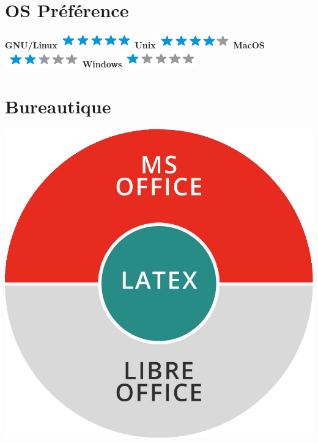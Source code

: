 \documentclass[]{friggeri-cv}
\begin{document}
\begin{aside}
  \section{OS Préférence}
    \textbf{GNU/Linux}\includegraphics[scale=0.40]{img/5stars.png}
    \textbf{Unix}\includegraphics[scale=0.40]{img/4stars.png}
    \textbf{MacOS}\includegraphics[scale=0.40]{img/2stars.png}
    \textbf{Windows}\includegraphics[scale=0.40]{img/1stars.png}
    ~
  \section{Bureautique}
    \includegraphics[scale=0.1]{img/bureautique.png}
    ~
\end{aside}
\vspace{0.42cm}
\end{document}
